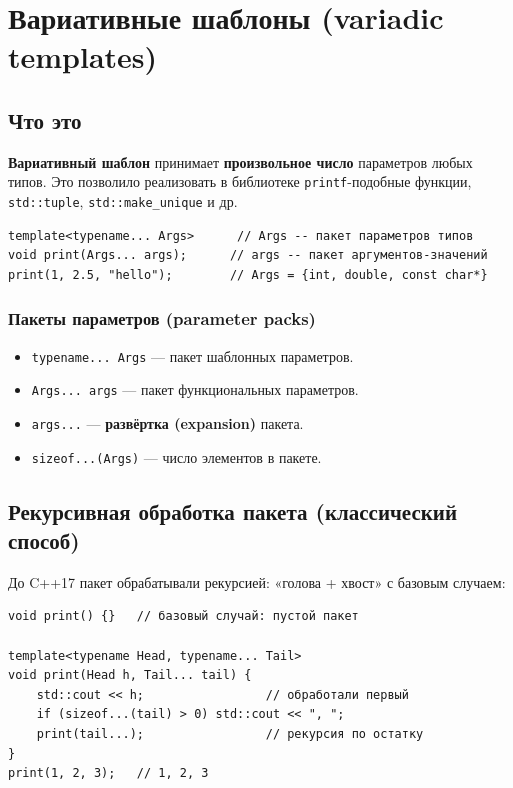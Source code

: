 
\section{Вариативные шаблоны (variadic templates)}

\subsection{Что это}

\textbf{Вариативный шаблон} принимает \textbf{произвольное число} параметров
любых типов. Это позволило реализовать в библиотеке \texttt{printf}-подобные
функции, \texttt{std::tuple}, \texttt{std::make\_unique} и др.

\begin{lstlisting}
template<typename... Args>      // Args -- пакет параметров типов
void print(Args... args);      // args -- пакет аргументов-значений
print(1, 2.5, "hello");        // Args = {int, double, const char*}
\end{lstlisting}

\subsubsection{Пакеты параметров (parameter packs)}

\begin{itemize}[leftmargin=2em]
    \item \texttt{typename... Args} --- пакет шаблонных параметров.
    \item \texttt{Args... args} --- пакет функциональных параметров.
    \item \texttt{args...} --- \textbf{развёртка (expansion)} пакета.
    \item \texttt{sizeof...(Args)} --- число элементов в пакете.
\end{itemize}

\subsection{Рекурсивная обработка пакета (классический способ)}

До C++17 пакет обрабатывали рекурсией: «голова + хвост» с базовым случаем:

\begin{lstlisting}
void print() {}   // базовый случай: пустой пакет

template<typename Head, typename... Tail>
void print(Head h, Tail... tail) {
    std::cout << h;                 // обработали первый
    if (sizeof...(tail) > 0) std::cout << ", ";
    print(tail...);                 // рекурсия по остатку
}
print(1, 2, 3);   // 1, 2, 3
\end{lstlisting}

